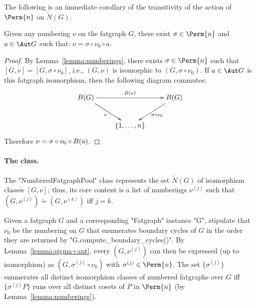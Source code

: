 The following is an immediate corollary of the transitivity of the
action of $\Perm{n}$ on $\tilde N(G)$.
\begin{lemma}\label{lemma:sigma+aut}
  Given any numbering $\nu$ on the fatgraph $G$, there exist $\sigma
  \in \Perm{n}$ and $a \in \Aut G$ such that: $\nu = \sigma \circ
  \nu_0 \circ a$.
\end{lemma}
\begin{proof}
  By Lemma~\ref{lemma:numberings}, there exists $\sigma \in \Perm{n}$
  such that $[G, \nu] = [G, \sigma \circ \nu_0]$, i.e., $(G, \nu)$ is
  isomorphic to $(G, \sigma \circ \nu_0)$.  If $a \in \Aut G$ is this
  fatgraph isomorphism, then the following diagram commutes:
  \begin{equation*}
    \xymatrix{
      \Holes{G} & & \Holes{G} \\
      & \{1, \ldots, n\} &
      \ar^{\Holes{a}} "1,1";"1,3"
      \ar_{\nu} "1,1";"2,2"
      \ar^{\sigma \circ \nu_0} "1,3";"2,2"
    }
  \end{equation*}
  Therefore $\nu = \sigma \circ \nu_0 \circ B(a)$.
\end{proof}

\paragraph{The  class.}
The "NumberedFatgraphPool" class represents the set $\tilde N(G)$ of
isomorphism classes $[G,\nu]$; thus, its core content is a list of
numberings $\nu^{(j)}$ such that $(G, \nu^{(j)}) \tilde= (G,
\nu^{(k)})$ iff $j = k$.

Given a fatgraph $G$ and a corresponding "Fatgraph" instance "G",
stipulate that $\nu_0$ be the numbering on $G$ that enumerates
boundary cycles of $G$ in the order they are returned by
"G.compute_boundary_cycles()".  By Lemma~\ref{lemma:sigma+aut}, every
$(G, \nu^{(j)})$ can then be expressed (up to isomorphism) as $(G,
\sigma^{(j)} \circ \nu_0)$ with $\sigma^{(j)} \in \Perm{n}$.  The set
$\{ \sigma^{(j)} \}$ enumerates all distinct isomorphism classes of
numbered fatgraphs over $G$ iff $\{ \sigma^{(j)}P \}$ runs over all
distinct cosets of $P$ in $\Perm{n}$ (by
Lemma~\ref{lemma:numberings}).

